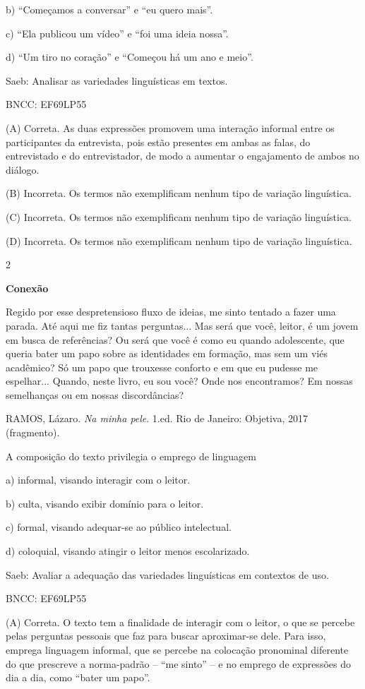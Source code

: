 b) ``Começamos a conversar'' e ``eu quero mais''.

c) ``Ela publicou um vídeo'' e ``foi uma ideia nossa''.

d) ``Um tiro no coração'' e ``Começou há um ano e meio''.

Saeb: Analisar as variedades linguísticas em textos.

BNCC: EF69LP55

(A) Correta. As duas expressões promovem uma interação informal entre os
participantes da entrevista, pois estão presentes em ambas as falas, do
entrevistado e do entrevistador, de modo a aumentar o engajamento de
ambos no diálogo.

(B) Incorreta. Os termos não exemplificam nenhum tipo de variação
linguística.

(C) Incorreta. Os termos não exemplificam nenhum tipo de variação
linguística.

(D) Incorreta. Os termos não exemplificam nenhum tipo de variação
linguística.

\num{2}

\textbf{Conexão}

Regido por esse despretensioso fluxo de ideias, me sinto tentado a fazer
uma parada. Até aqui me fiz tantas perguntas... Mas será que você,
leitor, é um jovem em busca de referências? Ou será que você é como eu
quando adolescente, que queria bater um papo sobre as identidades em
formação, mas sem um viés acadêmico? Só um papo que trouxesse conforto e
em que eu pudesse me espelhar... Quando, neste livro, eu sou você? Onde
nos encontramos? Em nossas semelhanças ou em nossas discordâncias?

RAMOS, Lázaro. \emph{Na minha pele}. 1.ed. Rio de Janeiro: Objetiva,
2017 (fragmento).

A composição do texto privilegia o emprego de linguagem

a) informal, visando interagir com o leitor.

b) culta, visando exibir domínio para o leitor.

c) formal, visando adequar-se ao público intelectual.

d) coloquial, visando atingir o leitor menos escolarizado.

Saeb: Avaliar a adequação das variedades linguísticas em contextos de
uso.

BNCC: EF69LP55

(A) Correta. O texto tem a finalidade de interagir com o leitor, o que
se percebe pelas perguntas pessoais que faz para buscar aproximar-se
dele. Para isso, emprega linguagem informal, que se percebe na colocação
pronominal diferente do que prescreve a norma-padrão -- ``me sinto'' --
e no emprego de expressões do dia a dia, como ``bater um papo''.

